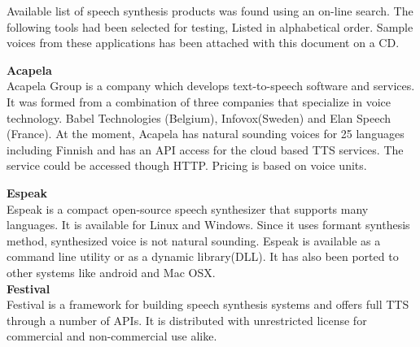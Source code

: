 \documentclass[11pt,a4paper,oneside,article]{memoir}
\begin{document}

%



Available list of speech synthesis products was found using an on-line search. The following tools had been selected for testing, Listed in alphabetical order. Sample voices from these applications has been attached with this document on a CD. 

\textbf{Acapela}\\
Acapela Group is a company which develops text-to-speech software and services. It was formed from a combination of three companies that specialize in voice technology. Babel Technologies (Belgium), Infovox(Sweden) and Elan Speech (France). At the moment, Acapela has natural sounding voices for 25 languages including Finnish and has an API access for the cloud based TTS services. The service could be accessed though HTTP. Pricing is based on voice units.\cite{acapela}

\textbf{Espeak}\\
Espeak is a compact open-source speech synthesizer that supports many languages. It is available for Linux and Windows. Since it uses formant synthesis method, synthesized voice is not natural sounding. Espeak is available as a command line utility or as a dynamic library(DLL). It has also been ported to other systems like android and Mac OSX. \cite{espeak}\\

\textbf{Festival} \\
Festival is a framework for building speech synthesis systems and offers full TTS through a number of APIs. It is distributed with unrestricted license for commercial and non-commercial use alike. \cite{festival}
\end{document}

